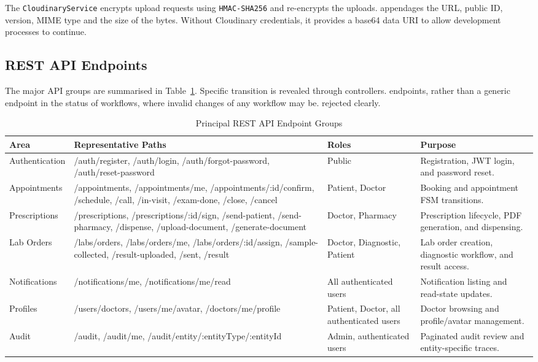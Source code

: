 \documentclass[12pt,a4paper]{report}
\begin{document}
The \texttt{CloudinaryService} encrypts upload requests using \texttt{HMAC-SHA256} and re-encrypts the uploads.
appendages the URL, public ID, version, MIME type and the size of the bytes. Without Cloudinary credentials,
it provides a base64 data URI to allow development processes to continue.

\subsection{REST API Endpoints}

The major API groups are summarised in Table~\ref{tab:endpoints}. Specific transition is revealed through controllers.
endpoints, rather than a generic endpoint in the status of workflows, where invalid changes of any workflow may be.
rejected clearly.

\begin{table}[tbp]
\caption{Principal REST API Endpoint Groups}
\label{tab:endpoints}
\centering
\footnotesize
\setlength{\tabcolsep}{3pt}
\renewcommand{\arraystretch}{1.12}
\begin{tabular}{|p{2cm}|p{5.7cm}|p{2.2cm}|p{2.4cm}|}
\hline
\textbf{Area} & \textbf{Representative Paths} & \textbf{Roles} & \textbf{Purpose}\\
\hline
Authentication & /auth/register, /auth/login, /auth/forgot-password, /auth/reset-password & Public & Registration, JWT login, and password reset.\\
\hline
Appointments & /appointments, /appointments/me, /appointments/:id/confirm, /schedule, /call, /in-visit, /exam-done, /close, /cancel & Patient, Doctor & Booking and appointment FSM transitions.\\
\hline
Prescriptions & /prescriptions, /prescriptions/:id/sign, /send-patient, /send-pharmacy, /dispense, /upload-document, /generate-document & Doctor, Pharmacy & Prescription lifecycle, PDF generation, and dispensing.\\
\hline
Lab Orders & /labs/orders, /labs/orders/me, /labs/orders/:id/assign, /sample-collected, /result-uploaded, /sent, /result & Doctor, Diagnostic, Patient & Lab order creation, diagnostic workflow, and result access.\\
\hline
Notifications & /notifications/me, /notifications/me/read & All authenticated users & Notification listing and read-state updates.\\
\hline
Profiles & /users/doctors, /users/me/avatar, /doctors/me/profile & Patient, Doctor, all authenticated users & Doctor browsing and profile/avatar management.\\
\hline
Audit & /audit, /audit/me, /audit/entity/:entityType/:entityId & Admin, authenticated users & Paginated audit review and entity-specific traces.\\
\hline
\end{tabular}
\end{table}
\end{document}
